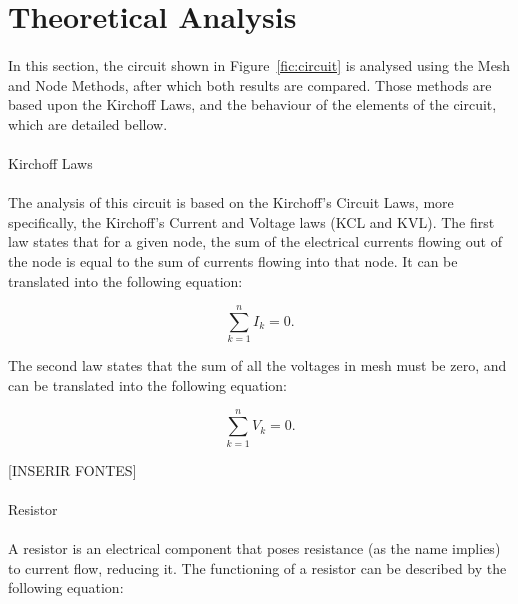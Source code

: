 \section{Theoretical Analysis}
\label{sec:analysis}

\paragraph{} In this section, the circuit shown in Figure~\ref{fic:circuit} is analysed using the Mesh and Node Methods, after which both results are compared.
Those methods are based upon the Kirchoff Laws, and the behaviour of the elements of the circuit, which are detailed bellow.

\paragraph{} Kirchoff Laws

\paragraph{} The analysis of this circuit is based on the Kirchoff's Circuit Laws, more specifically, the Kirchoff's Current and Voltage laws (KCL and KVL). The first law states that
 for a given node, the sum of the electrical currents flowing out of the node is equal to the sum of currents flowing into that node. 
It can be translated into the following equation:

\begin{equation}
	\sum_{k = 1}^n I_k = 0.
	\label{eq:kcl}
\end{equation}

The second law states that the sum of all the voltages in mesh must be zero, and can be translated into the following equation:

\begin{equation}
	\sum_{k = 1}^n V_k = 0.
	\label{eq:kvl}
\end{equation}

[INSERIR FONTES]

\paragraph{}Resistor

\paragraph{}A resistor is an electrical component that poses resistance (as the name implies) to current flow, reducing it. The functioning of a resistor can be described
 by the following equation:

